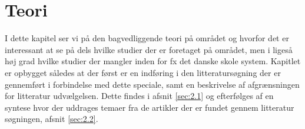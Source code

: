 \chapter{Teori}
\label{Ch:2}

I dette kapitel ser vi på den bagvedliggende teori på området og hvorfor det er interessant at se på dels hvilke studier der er foretaget på området, men i ligeså høj grad hvilke studier der mangler inden for fx det danske skole system. Kapitlet er opbygget således at der først er en indføring i den litteratursøgning der er gennemført i forbindelse med dette speciale, samt en beskrivelse af afgrænsningen for litteratur udvælgelsen. Dette findes i afsnit \vref{sec:2.1} og efterfølges af en syntese hvor der uddrages temaer fra de artikler der er fundet gennem litteratur søgningen, afsnit \vref{sec:2.2}.

